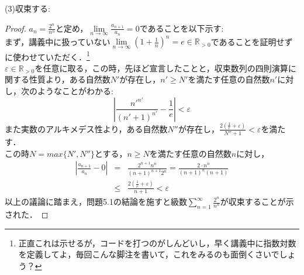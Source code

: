 \documentclass{jarticle}
\begin{document}
(3)収束する:\\
\begin{proof}
	$a_n=\frac{2^n}{n^n}$と定め，$\lim\limits_{n \to \infty} \frac{a_{n+1}}{a_n}=0$であることを以下示す:\\
	まず，講義中に扱っていない$\lim\limits_{n \to \infty} (1+\frac{1}{n})^n = e \in \mathbb{R}_{>0}$であることを証明せずに使わせていただく．\footnote{正直これは示せるが，コードを打つのがしんどいし，早く講義中に指数対数を定義してよ，毎回こんな脚注を書いて，これをみるのも面倒くさいでしょう？}\\
	$\varepsilon \in \mathbb{R}_{>0}$を任意に取る，この時，先ほど宣言したことと，収束数列の四則演算に関する性質より，ある自然数$N'$が存在し，$n' \ge N'$を満たす任意の自然数$n'$に対し，次のようなことがわかる:\\
	$$
	\left|  \frac{n'^{n'}}{(n'+1)^{n'}} - \frac{1}{e} \right| < \varepsilon
	$$
	また実数のアルキメデス性より，ある自然数$N''$が存在し，$\frac{2(\frac{1}{e}+ \varepsilon)}{N''+1}< \varepsilon$を満たす．\\
	この時$N= max\{ N', N'' \}$とする，$n \ge N$を満たす任意の自然数$n$に対し，\\
	\begin{equation}
		\begin{aligned}
			&\left| \frac{a_{n+1}}{a_n} -0 \right| &=& \frac{2^{n+1}n^n}{(n+1)^{n+1} 2^n} =  \frac{2 \cdot n^n}{(n+1)^{n}(n+1)}\\
			&				      &\le& \frac{2(\frac{1}{e} +\varepsilon)}{n+1} <\varepsilon&
		\end{aligned}
	\end{equation}
	以上の議論に踏まえ，問題5.1の結論を施すと級数$\sum\limits_{n=1}^{\infty} \frac{2^n}{n^n}$が収束することが示された．
\end{proof}
\end{document}
